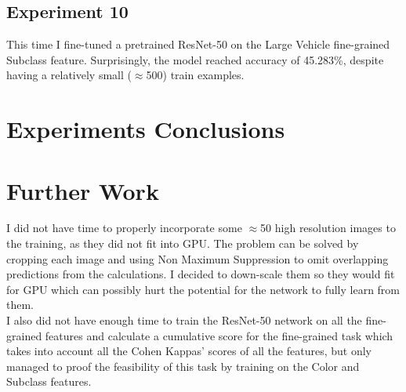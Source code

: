 \documentclass[]{article}
\begin{document}
\subsection{Experiment 10}
This time I fine-tuned a pretrained ResNet-50 on the Large Vehicle fine-grained Subclass feature. Surprisingly, the model reached accuracy of 45.283\%, despite having a relatively small ($\approx$500) train examples.

\section{Experiments Conclusions}

\section{Further Work}
I did not have time to properly incorporate some $\approx$50 high resolution images to the training, as they did not fit into GPU. The problem can be solved by cropping each image and using Non Maximum Suppression to omit overlapping predictions from the calculations. I decided to down-scale them so they would fit for GPU which can possibly hurt the potential for the network to fully learn from them.
\\
I also did not have enough time to train the ResNet-50 network on all the fine-grained features and calculate a cumulative score for the fine-grained task which takes into account all the Cohen Kappas' scores of all the features, but only managed to proof the feasibility of this task by training on the Color and Subclass features.
\end{document}
